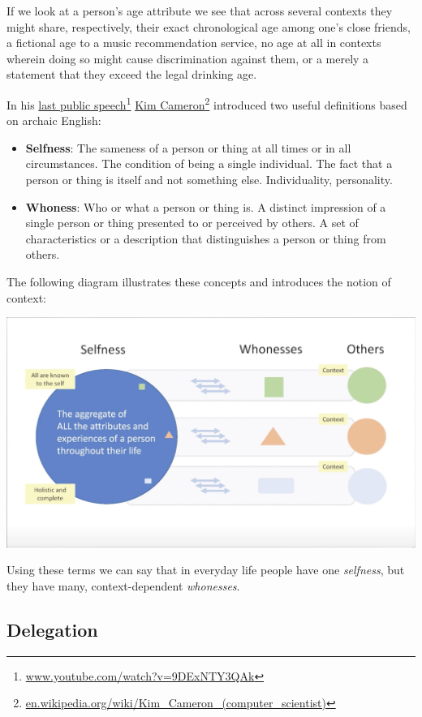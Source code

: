 \documentclass[11pt, oneside]{article}   	%
\newcommand{\hyperfootnote}[1][]{\def\ArgI{{#1}}\hyperfootnoteRelay}
\newcommand\hyperfootnoteRelay[2][]{\href{#1#2}{\ArgI}\footnote{\href{#1#2}{#2}}}
\begin{document}
If we look at a person's age attribute we see that across several contexts they might share, respectively, their exact chronological age among one's close friends, a fictional age to a music recommendation service, no age at all in contexts wherein doing so might cause discrimination against them, or a merely a statement that they exceed the legal drinking age. 

In his \hyperfootnote[last public speech][https://]{www.youtube.com/watch?v=9DExNTY3QAk}  
\hyperfootnote[Kim Cameron][https://]{en.wikipedia.org/wiki/Kim\_Cameron\_(computer\_scientist)} introduced two useful definitions based on archaic English:

\begin{itemize}
\item \textbf{Selfness}: The sameness of a person or thing at all times or in all circumstances. The condition of being a single individual. The fact that a person or thing is itself and not something else. Individuality, personality. 
\item \textbf{Whoness}: Who or what a person or thing is. A distinct impression of a single person or thing presented to or perceived by others. A set of characteristics or a description that distinguishes a person or thing from others. 
\end{itemize}

The following diagram illustrates these concepts and introduces the notion of context:

\includegraphics[width=\textwidth]{./images/selfness-and-whoness-larger.png}

Using these terms we can say that in everyday life people have one \emph{selfness}, but they have many, context-dependent \emph{whonesses}. 

\subsection{Delegation}
\end{document}
